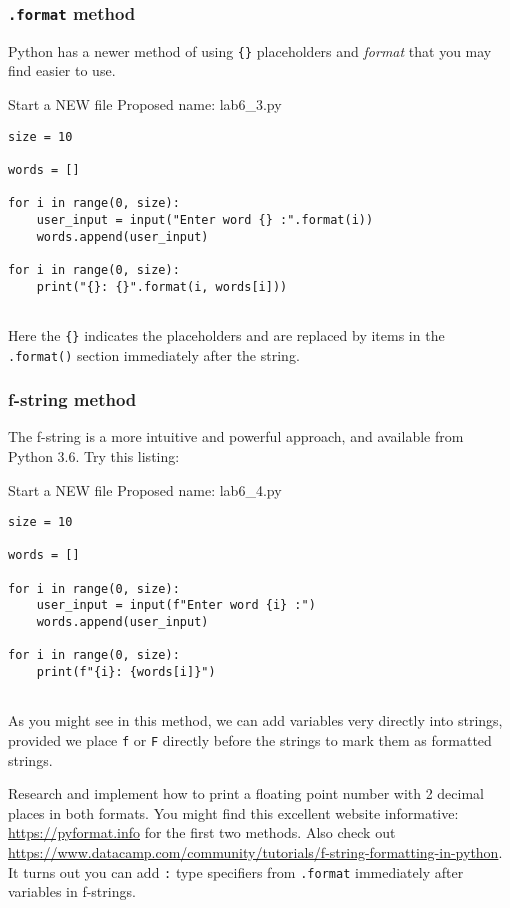 \documentclass[12pt,oneside]{cttutorial}
\begin{document}
\subsubsection{\lstinline!.format! method}

Python has a newer method of using \lstinline!{}! placeholders and \emph{format} that you may find easier to use.

\alert{Start a NEW file}
Proposed name: lab6\_3.py
\begin{lstlisting}
size = 10

words = []

for i in range(0, size):
    user_input = input("Enter word {} :".format(i))
    words.append(user_input)

for i in range(0, size):
    print("{}: {}".format(i, words[i]))
    
\end{lstlisting}

Here the \lstinline!{}! indicates the placeholders and are replaced by items in the \lstinline!.format()! section immediately after the string.

\subsubsection{f-string method}

The f-string is a more intuitive and powerful approach, and available from Python 3.6. Try this listing:

\alert{Start a NEW file}
Proposed name: lab6\_4.py
\begin{lstlisting}
size = 10

words = []

for i in range(0, size):
    user_input = input(f"Enter word {i} :")
    words.append(user_input)

for i in range(0, size):
    print(f"{i}: {words[i]}")
        
\end{lstlisting}

As you might see in this method, we can add variables very directly into strings, provided we place \lstinline!f! or \lstinline!F! directly before the strings to mark them as formatted strings.

Research and implement how to print a floating point number with 2 decimal places in both formats. You might find
this excellent website informative: \url{https://pyformat.info} for the first two methods. Also check out \url{https://www.datacamp.com/community/tutorials/f-string-formatting-in-python}. It turns out you can add \lstinline!:! type specifiers from \lstinline!.format! immediately after variables in f-strings.
\end{document}
